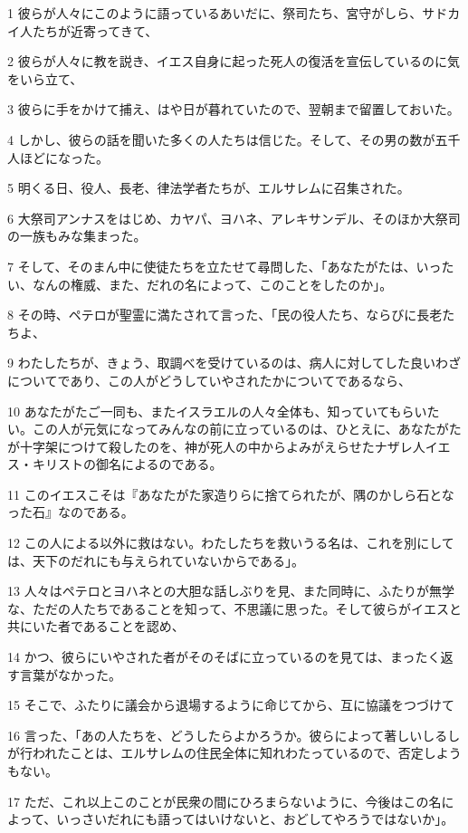 \par 1 彼らが人々にこのように語っているあいだに、祭司たち、宮守がしら、サドカイ人たちが近寄ってきて、
\par 2 彼らが人々に教を説き、イエス自身に起った死人の復活を宣伝しているのに気をいら立て、
\par 3 彼らに手をかけて捕え、はや日が暮れていたので、翌朝まで留置しておいた。
\par 4 しかし、彼らの話を聞いた多くの人たちは信じた。そして、その男の数が五千人ほどになった。
\par 5 明くる日、役人、長老、律法学者たちが、エルサレムに召集された。
\par 6 大祭司アンナスをはじめ、カヤパ、ヨハネ、アレキサンデル、そのほか大祭司の一族もみな集まった。
\par 7 そして、そのまん中に使徒たちを立たせて尋問した、「あなたがたは、いったい、なんの権威、また、だれの名によって、このことをしたのか」。
\par 8 その時、ペテロが聖霊に満たされて言った、「民の役人たち、ならびに長老たちよ、
\par 9 わたしたちが、きょう、取調べを受けているのは、病人に対してした良いわざについてであり、この人がどうしていやされたかについてであるなら、
\par 10 あなたがたご一同も、またイスラエルの人々全体も、知っていてもらいたい。この人が元気になってみんなの前に立っているのは、ひとえに、あなたがたが十字架につけて殺したのを、神が死人の中からよみがえらせたナザレ人イエス・キリストの御名によるのである。
\par 11 このイエスこそは『あなたがた家造りらに捨てられたが、隅のかしら石となった石』なのである。
\par 12 この人による以外に救はない。わたしたちを救いうる名は、これを別にしては、天下のだれにも与えられていないからである」。
\par 13 人々はペテロとヨハネとの大胆な話しぶりを見、また同時に、ふたりが無学な、ただの人たちであることを知って、不思議に思った。そして彼らがイエスと共にいた者であることを認め、
\par 14 かつ、彼らにいやされた者がそのそばに立っているのを見ては、まったく返す言葉がなかった。
\par 15 そこで、ふたりに議会から退場するように命じてから、互に協議をつづけて
\par 16 言った、「あの人たちを、どうしたらよかろうか。彼らによって著しいしるしが行われたことは、エルサレムの住民全体に知れわたっているので、否定しようもない。
\par 17 ただ、これ以上このことが民衆の間にひろまらないように、今後はこの名によって、いっさいだれにも語ってはいけないと、おどしてやろうではないか」。
